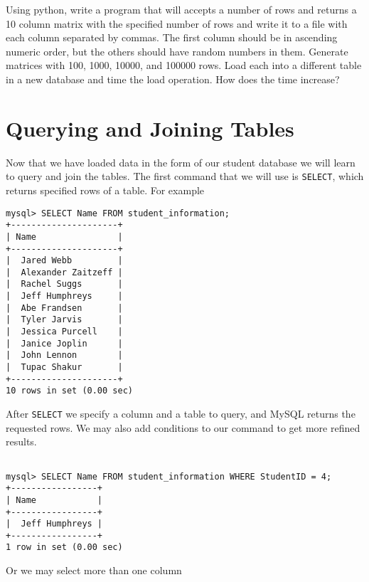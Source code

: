 {\begin{exercise}
\end{exercise}

\begin{exercise}

Using python, write a program that will accepts a number of rows and returns a 10 column matrix with the specified number of rows and write it to a file with each column separated by commas.  The first column should be in ascending numeric order, but the others should have random numbers in them.  Generate matrices with 100, 1000, 10000, and 100000 rows.  Load each into a different table in a new database and time the load operation.  How does the time increase?

\end{exercise}

\section{Querying and Joining Tables}

Now that we have loaded data in the form of our student database we will learn to query and join the tables.  The first command that we will use is {\tt SELECT}, which returns specified rows of a table.  For example

\begin{lstlisting}
mysql> SELECT Name FROM student_information;
+---------------------+
| Name                |
+---------------------+
|  Jared Webb         |
|  Alexander Zaitzeff |
|  Rachel Suggs       |
|  Jeff Humphreys     |
|  Abe Frandsen       |
|  Tyler Jarvis       |
|  Jessica Purcell    |
|  Janice Joplin      |
|  John Lennon        |
|  Tupac Shakur       |
+---------------------+
10 rows in set (0.00 sec)
\end{lstlisting}

After {\tt SELECT} we specify a column and a table to query, and MySQL returns the requested rows.  We may also add conditions to our command to get more refined results.

\begin{lstlisting}

mysql> SELECT Name FROM student_information WHERE StudentID = 4;
+-----------------+
| Name            |
+-----------------+
|  Jeff Humphreys |
+-----------------+
1 row in set (0.00 sec)

\end{lstlisting}

Or we may select more than one column

\begin{lstlisting}


\end{lstlisting}}

